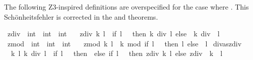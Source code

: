 \begin{isabellebody}
%
\endisadelimdocument
%
\isatagdocument
%
\isamarkuptrue%
%
\endisatagdocument
{\isafolddocument}%
%
\isadelimdocument
%
\endisadelimdocument
%
\begin{isamarkuptext}%
The following Z3-inspired definitions are overspecified for the case where . This
Schönheitsfehler is corrected in the  and  theorems.%
\end{isamarkuptext}\isamarkuptrue%
\isamarkupfalse%
\ z{}div\ {\isacharcolon}{\kern0pt}{\isacharcolon}{\kern0pt}\ {\isachardoublequoteopen}int\ {\isasymRightarrow}\ int\ {\isasymRightarrow}\ int{\isachardoublequoteclose}\ \isanewline
\ \ {\isachardoublequoteopen}z{}div\ k\ l\ {\isacharequal}{\kern0pt}\ {\isacharparenleft}{\kern0pt}if\ l\ {\isasymge}\ {}\ then\ k\ div\ l\ else\ {\isacharminus}{\kern0pt}\ {\isacharparenleft}{\kern0pt}k\ div\ {\isacharminus}{\kern0pt}\ l{\isacharparenright}{\kern0pt}{\isacharparenright}{\kern0pt}{\isachardoublequoteclose}\isanewline
\isanewline
{}\isamarkupfalse%
\ z{}mod\ {\isacharcolon}{\kern0pt}{\isacharcolon}{\kern0pt}\ {\isachardoublequoteopen}int\ {\isasymRightarrow}\ int\ {\isasymRightarrow}\ int{\isachardoublequoteclose}\ \isanewline
\ \ {\isachardoublequoteopen}z{}mod\ k\ l\ {\isacharequal}{\kern0pt}\ k\ mod\ {\isacharparenleft}{\kern0pt}if\ l\ {\isasymge}\ {}\ then\ l\ else\ {\isacharminus}{\kern0pt}\ l{\isacharparenright}{\kern0pt}{\isachardoublequoteclose}\isanewline
\isanewline
{}\isamarkupfalse%
\ div{\isacharunderscore}{\kern0pt}as{\isacharunderscore}{\kern0pt}z{}div{\isacharcolon}{\kern0pt}\isanewline
\ \ {\isachardoublequoteopen}{\isasymforall}k\ l{\isachardot}{\kern0pt}\ k\ div\ l\ {\isacharequal}{\kern0pt}\ {\isacharparenleft}{\kern0pt}if\ l\ {\isacharequal}{\kern0pt}\ {}\ then\ {}\ else\ if\ l\ {\isachargreater}{\kern0pt}\ {}\ then\ z{}div\ k\ l\ else\ z{}div\ {\isacharparenleft}{\kern0pt}{\isacharminus}{\kern0pt}\ k{\isacharparenright}{\kern0pt}\ {\isacharparenleft}{\kern0pt}{\isacharminus}{\kern0pt}\ l{\isacharparenright}{\kern0pt}{\isacharparenright}{\kern0pt}{\isachardoublequoteclose}\isanewline
%
\isadelimproof

\end{isabellebody}
